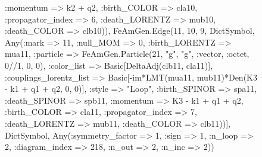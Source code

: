 \documentclass{revtex4}
\begin{document}
\begin{figure}[!htb]
\begin{center}
{:momentum => k2 + q2, :birth_COLOR => cla10, :propagator_index => 6, :death_LORENTZ => mub10, :death_COLOR => clb10)), FeAmGen.Edge(11, 10, 9, Dict{Symbol, Any}(:mark => 11, :null_MOM => 0, :birth_LORENTZ => mua11, :particle => FeAmGen.Particle(21, "g", "g", :vector, :octet, 0//1, 0, 0), :color_list => Basic[DeltaAdj(clb11, cla11)], :couplings_lorentz_list => Basic[-im*LMT(mua11, mub11)*Den(K3 - k1 + q1 + q2, 0, 0)], :style => "Loop", :birth_SPINOR => spa11, :death_SPINOR => spb11, :momentum => K3 - k1 + q1 + q2, :birth_COLOR => cla11, :propagator_index => 7, :death_LORENTZ => mub11, :death_COLOR => clb11))], Dict{Symbol, Any}(:symmetry_factor => 1, :sign => 1, :n_loop => 2, :diagram_index => 218, :n_out => 2, :n_inc => 2)) 
}
\end{center}
\end{figure}
\end{document}
